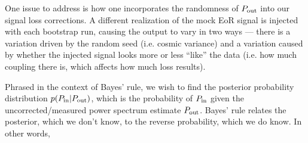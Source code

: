 \documentclass[preprint2,numberedappendix,tighten]{aastex6}  %
\newcommand{\phat}{\widehat{\mathbf{p}}}
\newcommand{\acl}[1]{{\color{red} \textbf{[ACL:  #1]}}}
\newcommand{\dcj}[1]{{\color{orange} \textbf{[DCJ: #1]}}}
\begin{document}

One issue to address is how one incorporates the randomness of $P_{\rm out}$ into our signal loss corrections. A different realization of the mock EoR signal is injected with each bootstrap run, causing the output to vary in two ways ---  there is a variation driven by the random seed (i.e. cosmic variance) and a variation caused by whether the injected signal looks more or less ``like'' the data (i.e. how much coupling there is, which affects how much loss results).

Phrased in the context of Bayes' rule, we wish to find the posterior probability distribution $p(P_{\rm in} | 
P_{\rm out})$, which is the probability of $P_{\rm in}$ given the uncorrected/measured power spectrum estimate $P_{\rm out}$.  Bayes' rule relates the posterior, which we don't know, to the reverse probability, which we do know. In other words,
\end{document}
